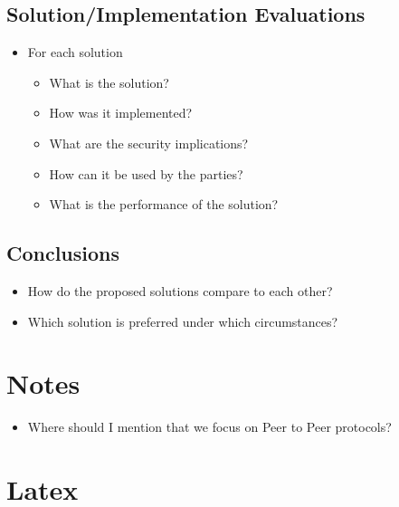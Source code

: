 \hypertarget{notes__06000-thesis.md__solutionimplementation-evaluations}{%
\section{Solution/Implementation
Evaluations}\label{notes__06000-thesis.md__solutionimplementation-evaluations}}

\begin{itemize}
\tightlist
\item
  For each solution

  \begin{itemize}
  \tightlist
  \item
    What is the solution?
  \item
    How was it implemented?
  \item
    What are the security implications?
  \item
    How can it be used by the parties?
  \item
    What is the performance of the solution?
  \end{itemize}
\end{itemize}

\hypertarget{notes__06000-thesis.md__conclusions}{%
\section{Conclusions}\label{notes__06000-thesis.md__conclusions}}

\begin{itemize}
\tightlist
\item
  How do the proposed solutions compare to each other?
\item
  Which solution is preferred under which circumstances?
\end{itemize}

\hypertarget{notes__07000-general.md}{}
\hypertarget{notes__07000-general.md__notes}{%
\chapter{Notes}\label{notes__07000-general.md__notes}}

\begin{itemize}
\tightlist
\item
  Where should I mention that we focus on Peer to Peer protocols?
\end{itemize}

\hypertarget{notes__09999-latex.md}{}
\hypertarget{notes__09999-latex.md__latex}{%
\chapter{Latex}\label{notes__09999-latex.md__latex}}


